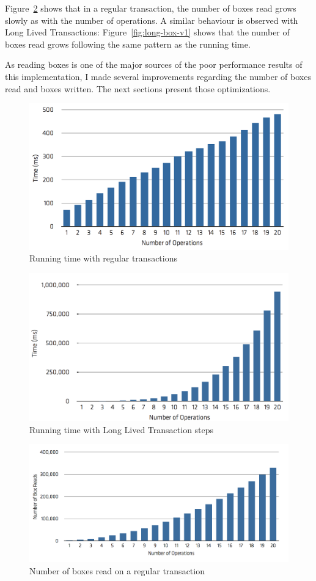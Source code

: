 Figure~\ref{fig:reg-box} shows that in a regular transaction, the
number of boxes read grows slowly as with the number of
operations. A similar behaviour is observed with Long Lived
Transactions: Figure~\ref{fig:long-box-v1} shows that the number of
boxes read grows following the same pattern as the running time.

As reading boxes is one of the major sources of the poor performance
results of this implementation, I made several improvements regarding
the number of boxes read and boxes written. The next sections present
those optimizations.

\begin{figure}
\centering
\includegraphics[width=0.9\linewidth]{time-regular}
\caption{Running time with regular transactions}
\label{fig:regTime}
\end{figure}

\begin{figure}
\centering
\includegraphics[width=0.9\linewidth]{time-long-v1}
\caption{Running time with Long Lived Transaction steps}
\end{figure}

\begin{figure}
\centering
\includegraphics[width=0.9\linewidth]{box-regular}
\caption{Number of boxes read on a regular transaction}
\label{fig:reg-box}
\end{figure}

